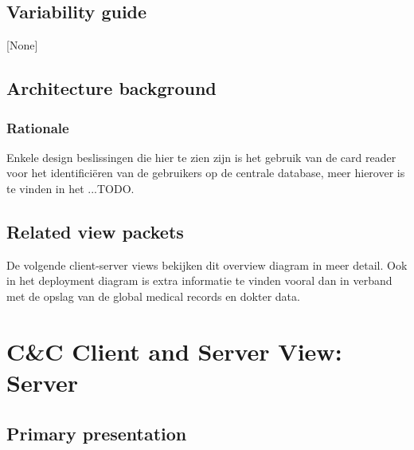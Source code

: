 \documentclass[a4paper,10pt]{article}
\begin{document}


\subsection{Variability guide}
[None]

\subsection{Architecture background}

\subsubsection{Rationale}
Enkele design beslissingen die hier te zien zijn is het gebruik van de card reader voor het identifici\"{e}ren van de gebruikers op de centrale database, meer hierover is te vinden in het ...TODO.

\subsection{Related view packets}
De volgende client-server views bekijken dit overview diagram in meer detail.  Ook in het deployment diagram is extra informatie te vinden vooral dan in verband met de opslag van de global medical records en dokter data.



\clearpage
\section{C\&C Client and Server View: Server}
\label{Client and Server View: Server}
\subsection{Primary presentation}
\end{document}

